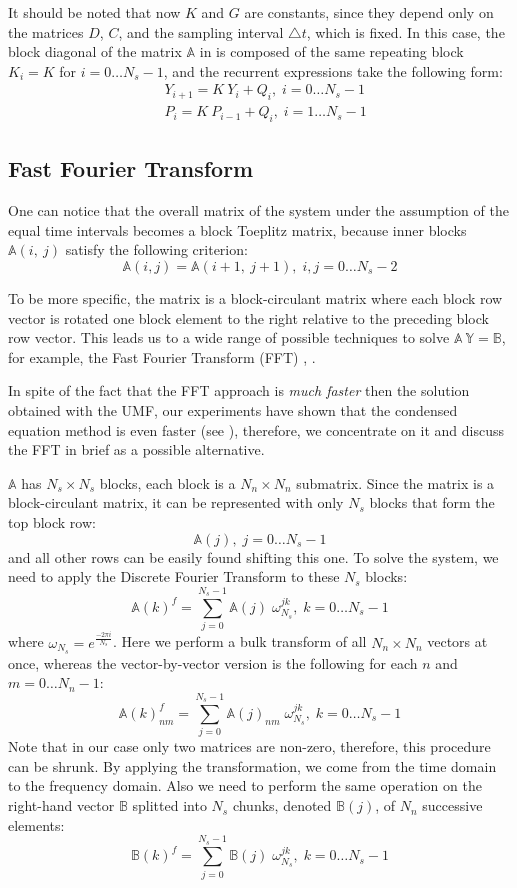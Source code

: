 It should be noted that now $K$ and $G$ are constants, since they depend only on the matrices $D$, $C$, and the sampling interval $\triangle t$, which is fixed. In this case, the block diagonal of the matrix $\mathbb{A}$ in  is composed of the same repeating block $K_i = K$ for $i = 0 \dots N_s - 1$, and the recurrent expressions take the following form:
\begin{align}
  & Y_{i + 1} = K \: Y_i + Q_i, \; i = 0 \dots N_s - 1 \nonumber \\
  & P_i = K \: P_{i - 1} + Q_i, \; i = 1 \dots N_s - 1 \nonumber
\end{align}

\subsection{Fast Fourier Transform}
One can notice that the overall matrix of the system under the assumption of the equal time intervals becomes a block Toeplitz matrix, because inner blocks $\mathbb{A}(i, \: j)$ satisfy the following criterion:
\[
  \mathbb{A}(i, j) = \mathbb{A}(i+1, \: j+1), \; i, j = 0 \dots N_s - 2
\]

To be more specific, the matrix is a block-circulant matrix where each block row vector is rotated one block element to the right relative to the preceding block row vector. This leads us to a wide range of possible techniques to solve \mbox{$\mathbb{A} \: \mathbb{Y} = \mathbb{B}$}, for example, the Fast Fourier Transform (FFT) \cite{mazancourt1983}, \cite{vescovo1997}.

In spite of the fact that the FFT approach is \emph{much faster} then the solution obtained with the UMF, our experiments have shown that the condensed equation method is even faster (see ), therefore, we concentrate on it and discuss the FFT in brief as a possible alternative.

$\mathbb{A}$ has $N_s \times N_s$ blocks, each block is a $N_n \times N_n$ submatrix. Since the matrix is a block-circulant matrix, it can be represented with only $N_s$ blocks that form the top block row:
\[
  \mathbb{A}(j), \; j = 0 \dots N_s - 1
\]
and all other rows can be easily found shifting this one. To solve the system, we need to apply the Discrete Fourier Transform to these $N_s$ blocks:
\[
  \mathbb{A}(k)^f = \sum_{j = 0}^{N_s - 1} \mathbb{A}(j) \; \omega_{N_s}^{jk}, \; k = 0 \dots N_s - 1
\]
where $\omega_{N_s} = e^{\frac{-2 \pi i}{N_s}}$. Here we perform a bulk transform of all $N_n \times N_n$ vectors at once, whereas the vector-by-vector version is the following for each $n$ and $m = 0 \dots N_n - 1$:
\[
  \mathbb{A}(k)^f_{nm} = \sum_{j = 0}^{N_s - 1} \mathbb{A}(j)_{nm} \; \omega_{N_s}^{jk}, \; k = 0 \dots N_s - 1
\]
Note that in our case only two matrices are non-zero, therefore, this procedure can be shrunk. By applying the transformation, we come from the time domain to the frequency domain. Also we need to perform the same operation on the right-hand vector $\mathbb{B}$ splitted into $N_s$ chunks, denoted $\mathbb{B}(j)$, of $N_n$ successive elements:
\[
  \mathbb{B}(k)^f = \sum_{j = 0}^{N_s - 1} \mathbb{B}(j) \; \omega_{N_s}^{jk}, \; k = 0 \dots N_s - 1
\]

